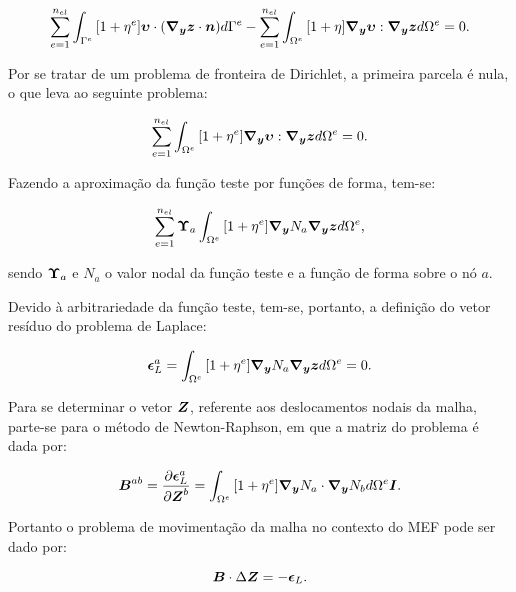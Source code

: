 \begin{equation}
    \sum_{e=1}^{n_{el}}{\int_{\Gamma^e}{[1+\eta^e]\boldsymbol{\upsilon}\cdot(\boldsymbol{\nabla_y}\boldsymbol{z}\cdot\boldsymbol{n}) d\Gamma^e}}-\sum_{e=1}^{n_{el}}{\int_{\Omega^e}{[1+\eta]\boldsymbol{\nabla_y}\boldsymbol{\upsilon}:\boldsymbol{\nabla_y}\boldsymbol{z} d\Omega^e}}=0\text{.}
\end{equation}

Por se tratar de um problema de fronteira de Dirichlet, a primeira parcela é nula, o que leva ao seguinte problema:

\begin{equation}
    \sum_{e=1}^{n_{el}}{\int_{\Omega^e}{[1+\eta^e]\boldsymbol{\nabla_y}\boldsymbol{\upsilon}:\boldsymbol{\nabla_y}\boldsymbol{z} d\Omega^e}}=0\text{.}
\end{equation}

Fazendo a aproximação da função teste por funções de forma, tem-se:

\begin{equation}
    \sum_{e=1}^{n_{el}}{\boldsymbol{\Upsilon}_a\int_{\Omega^e}{[1+\eta^e]\boldsymbol{\nabla_y} N_a\boldsymbol{\nabla_y}\boldsymbol{z}d\Omega^e}}\text{,}
\end{equation}

\noindent sendo $\boldsymbol{\Upsilon}_a$ e $N_a$ o valor nodal da função teste e a função de forma sobre o nó $a$.

Devido à arbitrariedade da função teste, tem-se, portanto, a definição do vetor resíduo do problema de Laplace:

\begin{equation}
    \boldsymbol{\epsilon}_L^a=\int_{\Omega^e}{[1+\eta^e]\boldsymbol{\nabla_y} N_a\boldsymbol{\nabla_y}\boldsymbol{z} d\Omega^e}=0\text{.}
\end{equation}

Para se determinar o vetor $\boldsymbol{Z}$, referente aos deslocamentos nodais da malha, parte-se para o método de Newton-Raphson, em que a matriz do problema é dada por:

\begin{equation}
    \boldsymbol{B}^{ab}=\frac{\partial{\boldsymbol{\epsilon}_L^a}}{\partial{\boldsymbol{Z}^b}}=\int_{\Omega^e}{[1+\eta^e]\boldsymbol{\nabla_y} N_a\cdot\boldsymbol{\nabla_y} N_b d\Omega^e}\boldsymbol{I}\text{.}
\end{equation}

Portanto o problema de movimentação da malha no contexto do MEF pode ser dado por:

\begin{equation}
    \boldsymbol{B}\cdot\Delta\boldsymbol{Z}=-\boldsymbol{\epsilon}_L\text{.}
\end{equation}